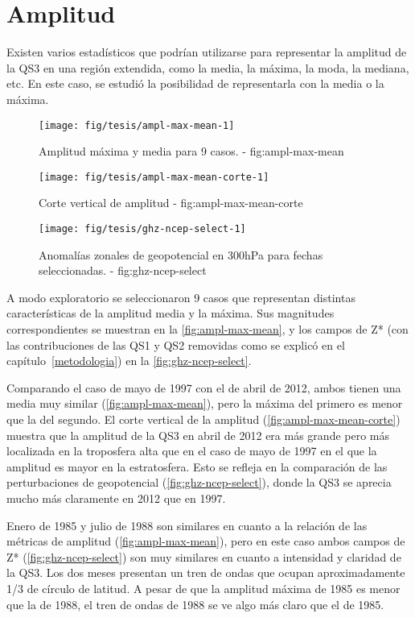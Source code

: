 \documentclass[spanish,a4paper,12p]{book}
\begin{document}
\section{Amplitud}\label{amplitud}

Existen varios estadísticos que podrían utilizarse para representar la
amplitud de la QS3 en una región extendida, como la media, la máxima, la
moda, la mediana, etc. En este caso, se estudió la posibilidad de
representarla con la media o la máxima.

\begin{figure*}
\texttt{[image: fig/tesis/ampl-max-mean-1]} \caption{Amplitud máxima y media para 9 casos. - fig:ampl-max-mean}\label{fig:ampl-max-mean}
\end{figure*}

\begin{figure*}
\texttt{[image: fig/tesis/ampl-max-mean-corte-1]} \caption{Corte vertical de amplitud - fig:ampl-max-mean-corte}\label{fig:ampl-max-mean-corte}
\end{figure*}

\begin{figure*}
\texttt{[image: fig/tesis/ghz-ncep-select-1]} \caption{Anomalías zonales de geopotencial en 300hPa para fechas seleccionadas. - fig:ghz-ncep-select}\label{fig:ghz-ncep-select}
\end{figure*}

A modo exploratorio se seleccionaron 9 casos que representan distintas
características de la amplitud media y la máxima. Sus magnitudes
correspondientes se muestran en la \autoref{fig:ampl-max-mean}, y los
campos de Z* (con las contribuciones de las QS1 y QS2 removidas como se
explicó en el capítulo~\ref{metodologia}) en la
\autoref{fig:ghz-ncep-select}.

Comparando el caso de mayo de 1997 con el de abril de 2012, ambos tienen
una media muy similar (\autoref{fig:ampl-max-mean}), pero la máxima del
primero es menor que la del segundo. El corte vertical de la amplitud
(\autoref{fig:ampl-max-mean-corte}) muestra que la amplitud de la QS3 en
abril de 2012 era más grande pero más localizada en la troposfera alta
que en el caso de mayo de 1997 en el que la amplitud es mayor en la
estratosfera. Esto se refleja en la comparación de las perturbaciones de
geopotencial (\autoref{fig:ghz-ncep-select}), donde la QS3 se aprecia
mucho más claramente en 2012 que en 1997.

Enero de 1985 y julio de 1988 son similares en cuanto a la relación de
las métricas de amplitud (\autoref{fig:ampl-max-mean}), pero en este
caso ambos campos de Z* (\autoref{fig:ghz-ncep-select}) son muy
similares en cuanto a intensidad y claridad de la QS3. Los dos meses
presentan un tren de ondas que ocupan aproximadamente 1/3 de círculo de
latitud. A pesar de que la amplitud máxima de 1985 es menor que la de
1988, el tren de ondas de 1988 se ve algo más claro que el de 1985.
\end{document}
